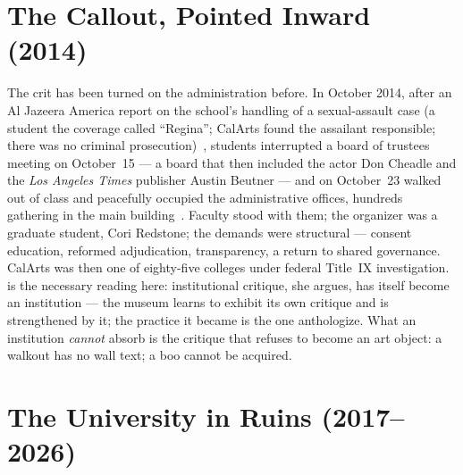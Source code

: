 \documentclass[10pt,letterpaper,twocolumn]{article}
\begin{document}
\section{The Callout, Pointed Inward (2014)}

The crit has been turned on the administration before. In October 2014, after
an Al Jazeera America report on the school's handling of a sexual-assault
case (a student the coverage called ``Regina''; CalArts found the assailant
responsible; there was no criminal prosecution)~\citep{aljazeera2014regina},
students interrupted a board of trustees meeting on October~15 --- a board
that then included the actor Don Cheadle and the \emph{Los Angeles Times}
publisher Austin Beutner --- and on October~23 walked out of class and
peacefully occupied the administrative offices, hundreds gathering in the
main building~\citep{steinhauer2014walkout, artforum2014walkout}. Faculty
stood with them; the organizer was a graduate student, Cori Redstone; the
demands were structural --- consent education, reformed adjudication,
transparency, a return to shared governance. CalArts was then one of
eighty-five colleges under federal Title~IX investigation.
\citet{fraser2005critique} is the necessary reading here: institutional
critique, she argues, has itself become an institution --- the museum learns
to exhibit its own critique and is strengthened by it; the practice it became
is the one \citet{alberro2009institutional} anthologize. What an institution
\emph{cannot} absorb is the critique that refuses to become an art object: a
walkout has no wall text; a boo cannot be acquired.

\section{The University in Ruins (2017--2026)}
\end{document}
